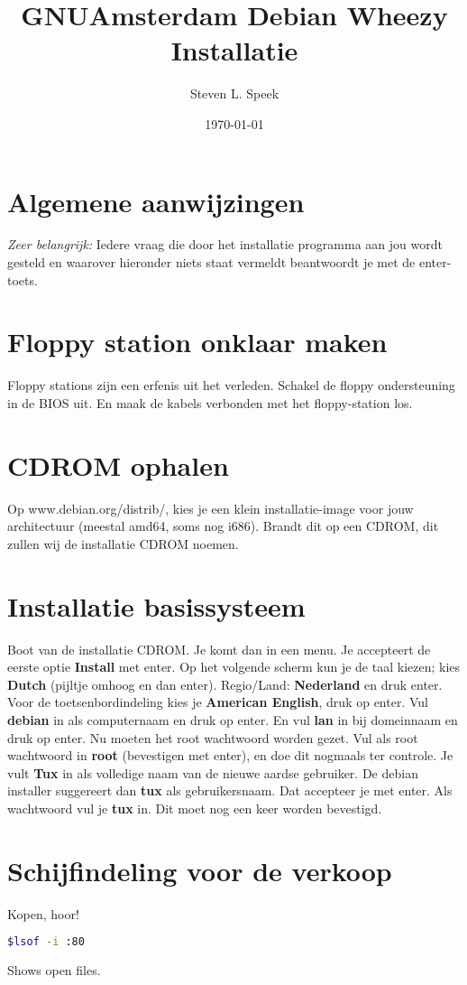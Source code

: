 \documentclass[12pt,a4paper]{article}
\begin{document}
\graphicspath{ {./images/} }
\lstset{language=bash}      
\author{Steven L. Speek}
\title{GNUAmsterdam Debian Wheezy Installatie}
\date{\today}
\maketitle
{}
\section{Algemene aanwijzingen}
\emph{Zeer belangrijk:} Iedere vraag die door het installatie programma aan jou wordt gesteld en waarover hieronder niets staat vermeldt beantwoordt je met de enter-toets.
\section{Floppy station onklaar maken}
Floppy stations zijn een erfenis uit het verleden. Schakel de floppy ondersteuning in de BIOS uit. En maak de kabels verbonden met het floppy-station los.
\section{CDROM ophalen}
Op www.debian.org/distrib/, kies je een klein installatie-image voor jouw architectuur (meestal amd64, soms nog i686).
Brandt dit op een CDROM, dit zullen wij de installatie CDROM noemen.
\section{Installatie basissysteem}
Boot van de installatie CDROM. Je komt dan in een menu.
Je accepteert de eerste optie \textbf{Install} met enter.
Op het volgende scherm kun je de taal kiezen; kies \textbf{Dutch} (pijltje omhoog en dan enter).
Regio/Land: \textbf{Nederland} en druk enter.
Voor de toetsenbordindeling kies je \textbf{American English}, druk op enter.
Vul \textbf{debian} in als computernaam en druk op enter.
En vul \textbf{lan} in bij domeinnaam en druk op enter.
Nu moeten het root wachtwoord worden gezet.
Vul als root wachtwoord in \textbf{root} (bevestigen met enter), en doe dit nogmaals ter controle.
Je vult \textbf{Tux} in als volledige naam van de nieuwe aardse gebruiker.
De debian installer suggereert dan \textbf{tux} als gebruikersnaam.
Dat accepteer je met enter.
Als wachtwoord vul je \textbf{tux} in. Dit moet nog een keer worden bevestigd.
\section{Schijfindeling voor de verkoop}
Kopen, hoor!
\begin{lstlisting}[language=bash]
$lsof -i :80
\end{lstlisting}
Shows open files.
\end{document}
